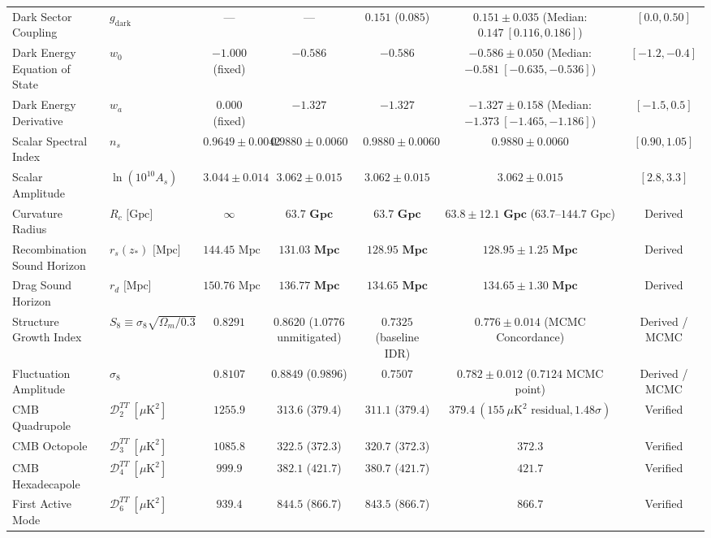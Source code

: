 \documentclass[11pt,a4paper]{article}
\theoremstyle{definition}
\begin{document}
\begin{table}[htbp]
{\begin{tabular}{llccccc}
Dark Sector Coupling & $g_{\mathrm{dark}}$ & --- & --- & $\mathbf{0.151}$ ($0.085$) & $\mathbf{0.151 \pm 0.035}$ (Median: $0.147\ [0.116, 0.186]$) & $[0.0, 0.50]$ \\
Dark Energy Equation of State & $w_0$ & $-1.000$ (fixed) & $-0.586$ & $-0.586$ & $\mathbf{-0.586 \pm 0.050}$ (Median: $-0.581\ [-0.635, -0.536]$) & $[-1.2, -0.4]$ \\
Dark Energy Derivative & $w_a$ & $0.000$ (fixed) & $-1.327$ & $-1.327$ & $\mathbf{-1.327 \pm 0.158}$ (Median: $-1.373\ [-1.465, -1.186]$) & $[-1.5, 0.5]$ \\
Scalar Spectral Index & $n_s$ & $0.9649 \pm 0.0042$ & $\mathbf{0.9880 \pm 0.0060}$ & $\mathbf{0.9880 \pm 0.0060}$ & $\mathbf{0.9880 \pm 0.0060}$ & $[0.90, 1.05]$ \\
Scalar Amplitude & $\ln(10^{10} A_s)$ & $3.044 \pm 0.014$ & $\mathbf{3.062 \pm 0.015}$ & $\mathbf{3.062 \pm 0.015}$ & $\mathbf{3.062 \pm 0.015}$ & $[2.8, 3.3]$ \\
\midrule
Curvature Radius & $R_c\text{ [Gpc]}$ & $\infty$ & $\mathbf{63.7\text{ Gpc}}$ & $\mathbf{63.7\text{ Gpc}}$ & $\mathbf{63.8 \pm 12.1\text{ Gpc}}$ ($63.7\text{--}144.7\text{ Gpc}$) & Derived \\
Recombination Sound Horizon & $r_s(z_*)\text{ [Mpc]}$ & $144.45\text{ Mpc}$ & $\mathbf{131.03\text{ Mpc}}$ & $\mathbf{128.95\text{ Mpc}}$ & $\mathbf{128.95 \pm 1.25\text{ Mpc}}$ & Derived \\
Drag Sound Horizon & $r_d\text{ [Mpc]}$ & $150.76\text{ Mpc}$ & $\mathbf{136.77\text{ Mpc}}$ & $\mathbf{134.65\text{ Mpc}}$ & $\mathbf{134.65 \pm 1.30\text{ Mpc}}$ & Derived \\
Structure Growth Index & $S_8 \equiv \sigma_8 \sqrt{\Omega_m/0.3}$ & $0.8291$ & $\mathbf{0.8620}$ ($1.0776$ unmitigated) & $\mathbf{0.7325}$ (baseline IDR) & $\mathbf{0.776 \pm 0.014}$ (MCMC Concordance) & Derived / MCMC \\
Fluctuation Amplitude & $\sigma_8$ & $0.8107$ & $\mathbf{0.8849}$ ($0.9896$) & $\mathbf{0.7507}$ & $\mathbf{0.782 \pm 0.012}$ ($0.7124$ MCMC point) & Derived / MCMC \\
CMB Quadrupole & $\mathcal{D}_2^{TT}\ [\mu\mathrm{K}^2]$ & $1255.9$ & $\mathbf{313.6}$ ($379.4$) & $\mathbf{311.1}$ ($379.4$) & $\mathbf{379.4}\ (155\ \mu\text{K}^2\text{ residual}, 1.48\sigma)$ & Verified \\
CMB Octopole & $\mathcal{D}_3^{TT}\ [\mu\mathrm{K}^2]$ & $1085.8$ & $\mathbf{322.5}$ ($372.3$) & $\mathbf{320.7}$ ($372.3$) & $\mathbf{372.3}$ & Verified \\
CMB Hexadecapole & $\mathcal{D}_4^{TT}\ [\mu\mathrm{K}^2]$ & $999.9$ & $\mathbf{382.1}$ ($421.7$) & $\mathbf{380.7}$ ($421.7$) & $\mathbf{421.7}$ & Verified \\
First Active Mode & $\mathcal{D}_6^{TT}\ [\mu\mathrm{K}^2]$ & $939.4$ & $\mathbf{844.5}$ ($866.7$) & $\mathbf{843.5}$ ($866.7$) & $\mathbf{866.7}$ & Verified \\
\bottomrule
\end{tabular}}
\end{table}
\end{document}
